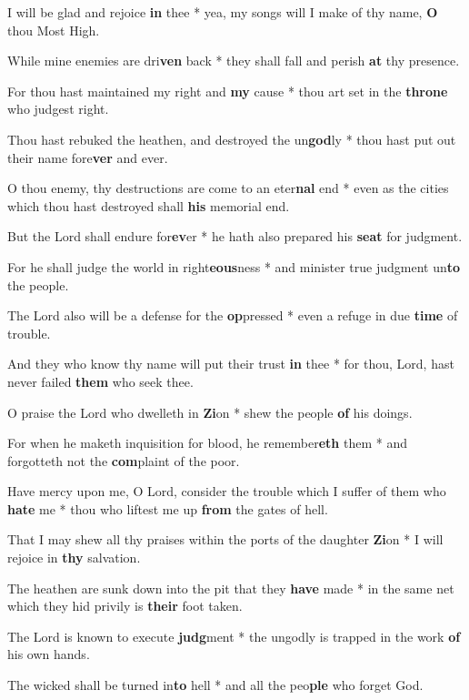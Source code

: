 \begin{multicols}{2}
	I will be glad and rejoice \textbf{in} thee * yea, my songs will I make of thy name, \textbf{O} thou Most High.
	
	While mine enemies are dri\textbf{ven} back * they shall fall and perish \textbf{at} thy presence.
	
	For thou hast maintained my right and \textbf{my} cause * thou art set in the \textbf{throne} who judgest right.
	
	Thou hast rebuked the heathen, and destroyed the un\textbf{god}ly * thou hast put out their name fore\textbf{ver} and ever.
	
	O thou enemy, thy destructions are come to an eter\textbf{nal} end * even as the cities which thou hast destroyed shall \textbf{his} memorial end.
	
	But the Lord shall endure for\textbf{ev}er * he hath also prepared his \textbf{seat} for judgment.
	
	For he shall judge the world in right\textbf{eous}ness * and minister true judgment un\textbf{to} the people.
	
	The Lord also will be a defense for the \textbf{op}pressed * even a refuge in due \textbf{time} of trouble.
	
	And they who know thy name will put their trust \textbf{in} thee * for thou, Lord, hast never failed \textbf{them} who seek thee.
	
	O praise the Lord who dwelleth in \textbf{Zi}on * shew the people \textbf{of} his doings.
	
	For when he maketh inquisition for blood, he remember\textbf{eth} them * and forgotteth not the \textbf{com}plaint of the poor.
	
	Have mercy upon me, O Lord, consider the trouble which I suffer of them who \textbf{hate} me * thou who liftest me up \textbf{from} the gates of hell.
	
	That I may shew all thy praises within the ports of the daughter \textbf{Zi}on * I will rejoice in \textbf{thy} salvation.
	
	The heathen are sunk down into the pit that they \textbf{have} made * in the same net which they hid privily is \textbf{their} foot taken.
	
	The Lord is known to execute\textbf{ judg}ment * the ungodly is trapped in the work \textbf{of} his own hands.
	
	The wicked shall be turned in\textbf{to} hell * and all the peo\textbf{ple} who forget God.
	

\end{multicols}
